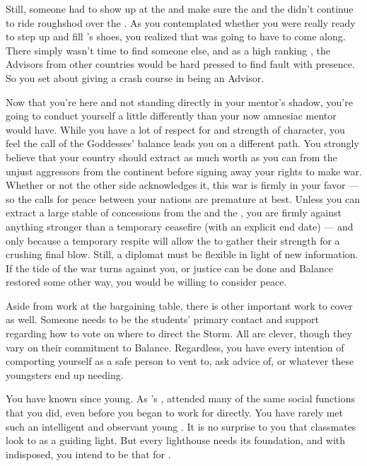 \documentclass[char]{GL2020}
\begin{document}
Still, someone had to show up at the \pSchool{} and make sure the \pTech{} and the \pFarm{} didn't continue to ride roughshod over the \pShip{}. As you contemplated whether you were really ready to step up and fill \cHeadDiplomat{}'s shoes, you realized that \cEbbPriest{} was going to have to come along. There simply wasn’t time to find someone else, and as a high ranking \cEbbPriest{\cleric}, the Advisors from other countries would be hard pressed to find fault with \cEbbPriest{\their} presence. So you set about giving \cEbbPriest{} a crash course in being an Advisor.

Now that you're here and not standing directly in your mentor's shadow, you're going to conduct yourself a little differently than your now amnesiac mentor would have. While you have a lot of respect for \cHeadDiplomat{} and \cHeadDiplomat{\their} strength of character, you feel the call of the Goddesses' balance leads you on a different path. You strongly believe that your country should extract as much worth as you can from the unjust aggressors from the continent before signing away your rights to make war. Whether or not the other side acknowledges it, this war is firmly in your favor — so the calls for peace between your nations are premature at best. Unless you can extract a large stable of concessions from the \pTech{} and the \pFarm{}, you are firmly against anything stronger than a temporary ceasefire (with an explicit end date) — and only because a temporary respite will allow the \pShippies{} to gather their strength for a crushing final blow. Still, a diplomat must be flexible in light of new information. If the tide of the war turns against you, or justice can be done and Balance restored some other way, you would be willing to consider peace.

Aside from work at the bargaining table, there is other important work to cover as well. Someone needs to be the students' primary contact and support regarding how to vote on where to direct the Storm. All are clever, though they vary on their commitment to Balance. Regardless, you have every intention of comporting yourself as a safe person to vent to, ask advice of, or whatever these youngsters end up needing.

You have known \cPresident{\full} since \cPresident{\theywere} young. As \cHeadDiplomat{}’s \cPresident{\nibling}, \cPresident{\they} attended many of the same social functions that you did, even before you began to work for \cHeadDiplomat{} directly. You have rarely met such an intelligent and observant young \cPresident{\person}. It is no surprise to you that \cPresident{\their} classmates look to \cPresident{\them} as a guiding light. But every lighthouse needs its foundation, and with \cHeadDiplomat{} indisposed, you intend to be that for \cPresident{}.
\end{document}

